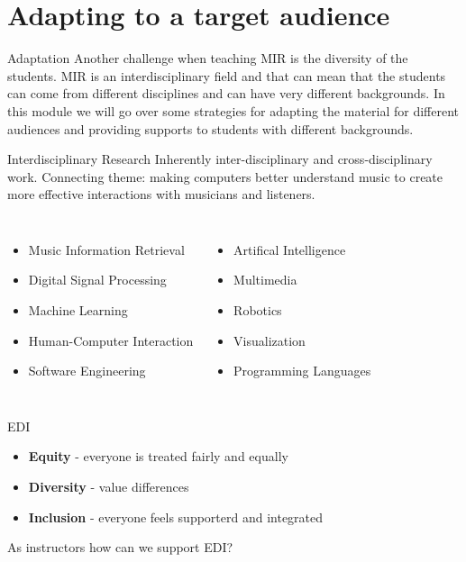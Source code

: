 \documentclass[12pt]{beamer}
\begin{document}
\section{Adapting to a target audience}

\begin{frame}{Adaptation}
Another challenge when teaching MIR is the diversity of the students.
MIR is an interdisciplinary field and that can mean that the students
can come from different disciplines and can have very different backgrounds. 
In this module we will go over some strategies for adapting
the material for different audiences and providing supports
to students with different backgrounds. 
\end{frame}


\begin{frame}{Interdisciplinary Research}
Inherently inter-disciplinary and cross-disciplinary work. Connecting
theme: making computers better understand music to create more
effective interactions with musicians and listeners. 

\begin{columns}
\begin{itemize} 
\item{Music Information Retrieval} 
\item{Digital Signal Processing} 
\item{Machine Learning} 
\item{Human-Computer Interaction} 
\item{Software Engineering} 
\end{itemize} 

\begin{itemize}
\item{Artifical Intelligence}
\item{Multimedia}
\item{Robotics} 
\item{Visualization}
\item{Programming Languages} 
\end{itemize} 
\end{columns}
\end{frame}

\begin{frame}{EDI}
\begin{itemize}
\item{{\bf Equity} - everyone is treated fairly and equally}
\item{{\bf Diversity} - value differences}
\item{{\bf Inclusion} - everyone feels supporterd and integrated}
\end{itemize}
As instructors how can we support EDI? 
\end{frame} 
\end{document}
